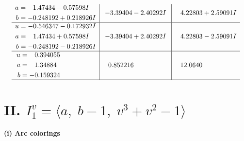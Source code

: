 \documentclass[1p]{elsarticle_modified}
\theoremstyle{definition}
\begin{document}
$$\begin{array}{c|c|c}
\begin{aligned}
a &= \phantom{-}1.47434 - 0.57598 I \\
b &= -0.248192 + 0.218926 I\end{aligned}
 & -3.39404 - 2.40292 I & \phantom{-}4.22803 + 2.59091 I \\ \hline\begin{aligned}
u &= -0.546347 - 0.172932 I \\
a &= \phantom{-}1.47434 + 0.57598 I \\
b &= -0.248192 - 0.218926 I\end{aligned}
 & -3.39404 + 2.40292 I & \phantom{-}4.22803 - 2.59091 I \\ \hline\begin{aligned}
u &= \phantom{-}0.394055\phantom{ +0.000000I} \\
a &= \phantom{-}1.34884\phantom{ +0.000000I} \\
b &= -0.159324\phantom{ +0.000000I}\end{aligned}
 & \phantom{-}0.852216\phantom{ +0.000000I} & \phantom{-}12.0640\phantom{ +0.000000I}\\
 \hline 
 \end{array}$$\newpage\newpage\renewcommand{\arraystretch}{1}
\centering \section*{II. $I^v_{1}= \langle a,\;b-1,\;v^3+v^2-1 \rangle$}
\flushleft \textbf{(i) Arc colorings}\\
\end{document}

